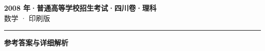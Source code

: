\documentclass[zihao=5, a4paper]{ctexart}
\begin{document}
\begin{center}
  {\Large\bfseries 2008 年·普通高等学校招生考试·四川卷·理科}\\[4pt]
  {\large 数学 · 印刷版}
\end{center}
\medskip
{}

\par\bigskip\hrule\bigskip
{}
\begin{center}{\large\bfseries 参考答案与详细解析}\end{center}
\smallskip

\end{document}
